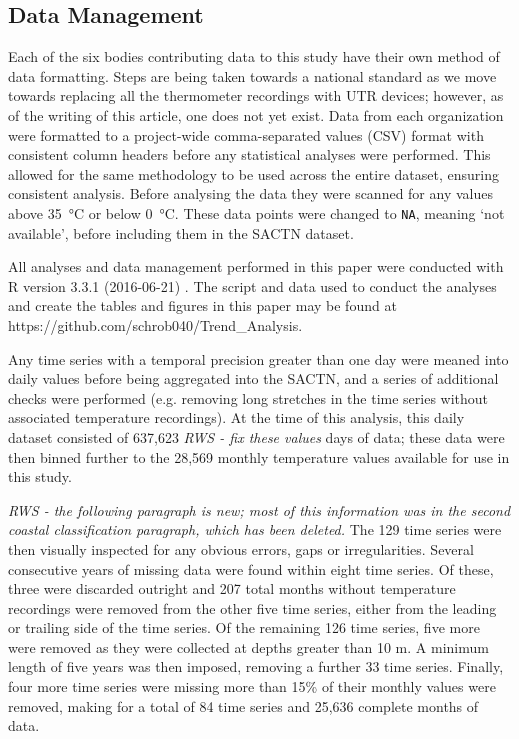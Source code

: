 \documentclass{ametsoc}
\begin{document}
\subsection{Data Management}
Each of the six bodies contributing data to this study have their own method of data formatting. Steps are being taken towards a national standard as we move towards replacing all the thermometer recordings with UTR devices; however, as of the writing of this article, one does not yet exist. Data from each organization were formatted to a project-wide comma-separated values (CSV) format with consistent column headers before any statistical analyses were performed. This allowed for the same methodology to be used across the entire dataset, ensuring consistent analysis. Before analysing the data they were scanned for any values above \SI{35}{\degreeCelsius} or below \SI{0}{\degreeCelsius}. These data points were changed to \texttt{NA}, meaning `not available', before including them in the SACTN dataset.

All analyses and data management performed in this paper were conducted with R version 3.3.1 (2016-06-21) \citep{R}. The script and data used to conduct the analyses and create the tables and figures in this paper may be found at https://github.com/schrob040/Trend_Analysis.

Any time series with a temporal precision greater than one day were meaned into daily values before being aggregated into the SACTN, and a series of additional checks were performed (e.g. removing long stretches in the time series without associated temperature recordings). At the time of this analysis, this daily dataset consisted of 637,623 \emph{RWS - fix these values} days of data; these data were then binned further to the 28,569 monthly temperature values available for use in this study.

\emph{RWS - the following paragraph is new; most of this information was in the second coastal classification paragraph, which has been deleted.}
The 129 time series were then visually inspected for any obvious errors, gaps or irregularities. Several consecutive years of missing data were found within eight time series. Of these, three were discarded outright and 207 total months without temperature recordings were removed from the other five time series, either from the leading or trailing side of the time series. Of the remaining 126 time series, five more were removed as they were collected at depths greater than 10 m. A minimum length of five years was then imposed, removing a further 33 time series. Finally, four more time series were missing more than 15\% of their monthly values were removed, making for a total of 84 time series and 25,636 complete months of data.
\end{document}
